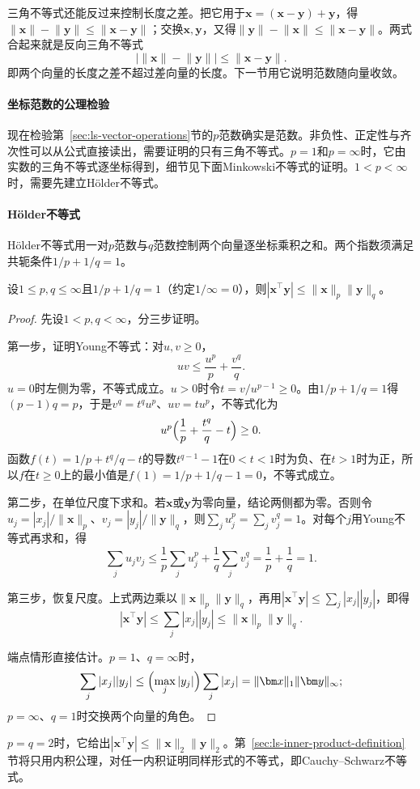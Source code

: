 三角不等式还能反过来控制长度之差。把它用于$\bm x=(\bm x-\bm y)+\bm y$，得$\lVert\bm x\rVert-\lVert\bm y\rVert\leq\lVert\bm x-\bm y\rVert$；交换$\bm x,\bm y$，又得$\lVert\bm y\rVert-\lVert\bm x\rVert\leq\lVert\bm x-\bm y\rVert$。两式合起来就是反向三角不等式
\begin{equation}
 \bigl|\lVert\bm x\rVert-\lVert\bm y\rVert\bigr|\leq\lVert\bm x-\bm y\rVert.
 \label{eq:ls-reverse-triangle}
\end{equation}
即两个向量的长度之差不超过差向量的长度。下一节用它说明范数随向量收敛。

\paragraph{坐标范数的公理检验}
\label{sec:ls-norms-distances}
\label{sec:linear-algebra-distance-relations}
现在检验第~\ref{sec:ls-vector-operations}节的$p$范数确实是范数。非负性、正定性与齐次性可以从公式直接读出，需要证明的只有三角不等式。$p=1$和$p=\infty$时，它由实数的三角不等式逐坐标得到，细节见下面Minkowski不等式的证明。$1<p<\infty$时，需要先建立Hölder不等式。

\paragraph{Hölder不等式}
Hölder不等式用一对$p$范数与$q$范数控制两个向量逐坐标乘积之和。两个指数须满足共轭条件$1/p+1/q=1$。
\begin{theorem}[有限维Hölder不等式]
\label{thm:linear-algebra-holder}
设$1\leq p,q\leq\infty$且$1/p+1/q=1$（约定$1/\infty=0$），则$|\bm x^\top\bm y|\leq\lVert\bm x\rVert_p\lVert\bm y\rVert_q$。
\end{theorem}
\begin{proof}
先设$1<p,q<\infty$，分三步证明。

第一步，证明Young不等式：对$u,v\geq0$，
\[
 uv\leq\frac{u^p}{p}+\frac{v^q}{q}.
\]
$u=0$时左侧为零，不等式成立。$u>0$时令$t=v/u^{p-1}\geq0$。由$1/p+1/q=1$得$(p-1)q=p$，于是$v^q=t^qu^p$、$uv=tu^p$，不等式化为
\[
 u^p\Bigl(\frac1p+\frac{t^q}{q}-t\Bigr)\geq0.
\]
函数$f(t)=1/p+t^q/q-t$的导数$t^{q-1}-1$在$0<t<1$时为负、在$t>1$时为正，所以$f$在$t\geq0$上的最小值是$f(1)=1/p+1/q-1=0$，不等式成立。

第二步，在单位尺度下求和。若$\bm x$或$\bm y$为零向量，结论两侧都为零。否则令$u_j=|x_j|/\lVert\bm x\rVert_p$、$v_j=|y_j|/\lVert\bm y\rVert_q$，则$\sum_ju_j^p=\sum_jv_j^q=1$。对每个$j$用Young不等式再求和，得
\[
 \sum_ju_jv_j\leq\frac1p\sum_ju_j^p+\frac1q\sum_jv_j^q=\frac1p+\frac1q=1.
\]

第三步，恢复尺度。上式两边乘以$\lVert\bm x\rVert_p\lVert\bm y\rVert_q$，再用$|\bm x^\top\bm y|\leq\sum_j|x_j||y_j|$，即得
\[
 |\bm x^\top\bm y|\leq\sum_j|x_j||y_j|\leq\lVert\bm x\rVert_p\lVert\bm y\rVert_q.
\]

端点情形直接估计。$p=1$、$q=\infty$时，
\[
 \sum_j|x_j||y_j|\leq\Bigl(\max_j|y_j|\Bigr)\sum_j|x_j|=\lVert\bm x\rVert_1\lVert\bm y\rVert_\infty;
\]
$p=\infty$、$q=1$时交换两个向量的角色。
\end{proof}
$p=q=2$时，它给出$|\bm x^\top\bm y|\leq\lVert\bm x\rVert_2\lVert\bm y\rVert_2$。第~\ref{sec:ls-inner-product-definition}节将只用内积公理，对任一内积证明同样形式的不等式，即Cauchy--Schwarz不等式。

